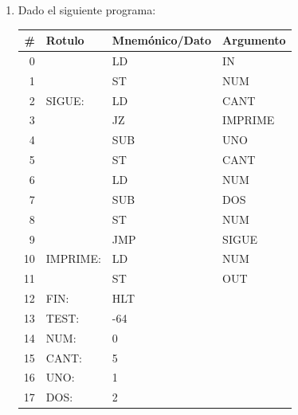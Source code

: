 \documentclass[12pt]{article}
\begin{document}
\begin{enumerate}
\begin{tabular}{|r||l|l|l||c|}
        \end{tabular}

        \begin{enumerate}

            \item ¿Qué tarea realiza el programa?

            \item ¿Qué modificación sería necesaria realizarle al código
                ensamblador para que el programa imprima cada número dos
                veces? ¿Se modifican la misma cantidad de celdas en el
                programa en código maquina?

        \end{enumerate}

    \item Dado el siguiente programa:

        \begin{tabular}{|r||l|l|l|}

            \hline

            \textbf{\#} & \textbf{Rotulo} & \textbf{Mnemónico/Dato} &
            \textbf{Argumento}\\
            \hline
            \hline

            0 & & LD & IN\\ \hline
            1 & & ST & NUM\\ \hline
            2 & SIGUE: & LD & CANT\\ \hline
            3 & & JZ & IMPRIME\\ \hline
            4 & & SUB & UNO\\ \hline
            5 & & ST & CANT\\ \hline
            6 & & LD & NUM\\ \hline
            7 & & SUB & DOS\\ \hline
            8 & & ST & NUM\\ \hline
            9 & & JMP & SIGUE\\ \hline
            10 & IMPRIME: & LD & NUM\\ \hline
            11 & & ST & OUT\\ \hline
            12 & FIN: & HLT & \\ \hline
            13 & TEST: & -64 & \\ \hline
            14 & NUM: & 0 & \\ \hline
            15 & CANT: & 5 & \\ \hline
            16 & UNO: & 1 & \\ \hline
            17 & DOS: & 2 & \\ \hline


\end{tabular}
\end{enumerate}
\end{document}
